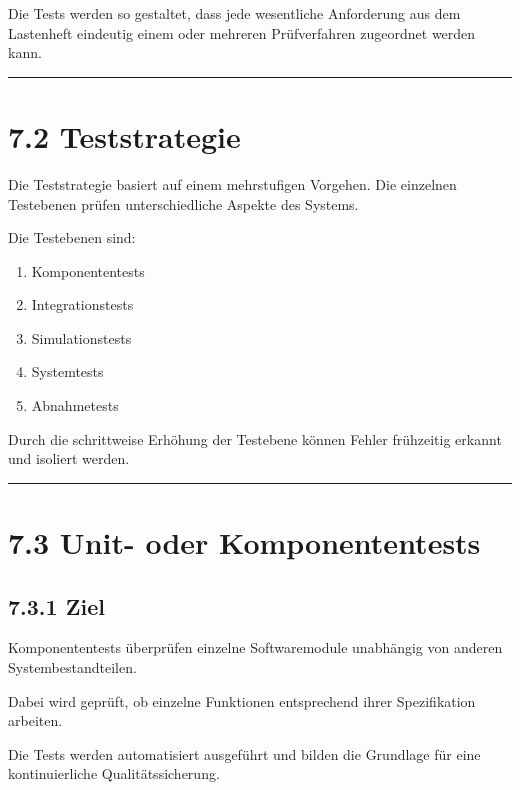 \documentclass[
  a4paper,
  12pt,
  DIV=12,        %
  parskip=half,  %
  headings=small %
]{scrartcl}
\theoremstyle{definition}
\providecommand{\tightlist}{%
  \setlength{\itemsep}{0pt}\setlength{\parskip}{0pt}}
\theoremstyle{definition}
\providecommand{\tightlist}{%
  \setlength{\itemsep}{0pt}\setlength{\parskip}{0pt}}
\begin{document}
Die Tests werden so gestaltet, dass jede wesentliche Anforderung aus dem
Lastenheft eindeutig einem oder mehreren Prüfverfahren zugeordnet werden
kann.

\begin{center}\rule{0.5\linewidth}{0.5pt}\end{center}

\section{7.2 Teststrategie}\label{teststrategie}

Die Teststrategie basiert auf einem mehrstufigen Vorgehen. Die einzelnen
Testebenen prüfen unterschiedliche Aspekte des Systems.

Die Testebenen sind:

\begin{enumerate}
\def\labelenumi{\arabic{enumi}.}
\tightlist
\item
  Komponententests
\item
  Integrationstests
\item
  Simulationstests
\item
  Systemtests
\item
  Abnahmetests
\end{enumerate}

Durch die schrittweise Erhöhung der Testebene können Fehler frühzeitig
erkannt und isoliert werden.

\begin{center}\rule{0.5\linewidth}{0.5pt}\end{center}

\section{7.3 Unit- oder
Komponententests}\label{unit--oder-komponententests}

\subsection{7.3.1 Ziel}\label{ziel}

Komponententests überprüfen einzelne Softwaremodule unabhängig von
anderen Systembestandteilen.

Dabei wird geprüft, ob einzelne Funktionen entsprechend ihrer
Spezifikation arbeiten.

Die Tests werden automatisiert ausgeführt und bilden die Grundlage für
eine kontinuierliche Qualitätssicherung.
\end{document}
